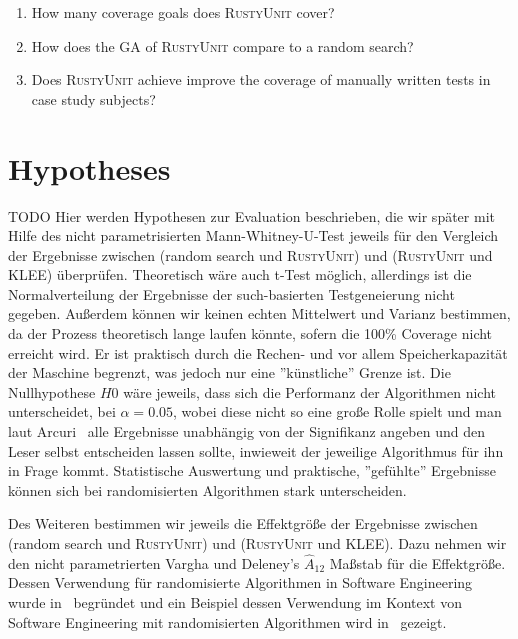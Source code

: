 \documentclass[paper=a4,%
  twoside,%
  BCOR4mm,%
  abstract=true,%
  toc=bibliography,%
  chapterprefix=true,%
  toc=bibliographynumbered,%
  open=right,%
  english,%
  pagesize=pdftex]{scrreprt}
\newcommand{\tech}{\textsc{RustyUnit}\xspace}
\begin{document}
\begin{enumerate}[start=1, label={\bfseries RQ\arabic*:}]
    \item How many coverage goals does \tech cover?
    \item How does the \ac{GA} of \tech compare to a random search?
    \item Does \tech achieve improve the coverage of manually written tests in case study subjects?
\end{enumerate} 


\section{Hypotheses}
\label{sec:hypotheses}
TODO Hier werden Hypothesen zur Evaluation beschrieben, die wir später mit Hilfe des nicht parametrisierten Mann-Whitney-U-Test jeweils für den Vergleich der Ergebnisse zwischen (random search und \tech) und (\tech und \textsc{KLEE}) überprüfen. Theoretisch wäre auch t-Test möglich, allerdings ist die Normalverteilung der Ergebnisse der such-basierten Testgeneierung nicht gegeben. Außerdem können wir keinen echten Mittelwert und Varianz bestimmen, da der Prozess theoretisch lange laufen könnte, sofern die 100\% Coverage nicht erreicht wird. Er ist praktisch durch die Rechen- und vor allem Speicherkapazität der Maschine begrenzt, was jedoch nur eine ''künstliche'' Grenze ist. Die Nullhypothese $H0$ wäre jeweils, dass sich die Performanz der Algorithmen nicht unterscheidet, bei $\alpha = 0.05$, wobei diese nicht so eine große Rolle spielt und man laut Arcuri~\cite{Arcuri2011} alle Ergebnisse unabhängig von der Signifikanz angeben und den Leser selbst entscheiden lassen sollte, inwieweit der jeweilige Algorithmus für ihn in Frage kommt. Statistische Auswertung und praktische, ''gefühlte'' Ergebnisse können sich bei randomisierten Algorithmen stark unterscheiden. 

Des Weiteren bestimmen wir jeweils die Effektgröße der Ergebnisse zwischen (random search und \tech) und (\tech und \textsc{KLEE}). Dazu nehmen wir den nicht parametrierten Vargha und Deleney's $\hat{A}_{12}$ Maßstab für die Effektgröße. Dessen Verwendung für randomisierte Algorithmen in Software Engineering wurde in~\cite{Leech2002} begründet und ein Beispiel dessen Verwendung im Kontext von Software Engineering mit randomisierten Algorithmen wird in~\cite{Poulding2010} gezeigt. 
\end{document}
